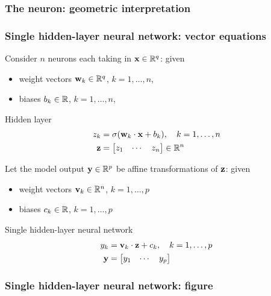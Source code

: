 \begin{frame}
    \frametitle{The neuron: geometric interpretation}
\end{frame}

\begin{frame}
    \frametitle{Single hidden-layer neural network: vector equations}

    Consider $n$ neurons each taking in $\mathbf{x} \in \mathbb{R}^q$: given
    \begin{itemize}
        \item weight vectors $\mathbf{w}_k \in \mathbb{R}^q$, $k = 1, \ldots, n$,
        \item biases $b_k \in \mathbb{R}$, $k = 1, \ldots, n$,
    \end{itemize}
    \begin{block}{Hidden layer}
        \vspace{-1em}
        \begin{align*}
            z_k &= \sigma(\mathbf{w}_k \cdot \mathbf{x} + b_k), \quad k = 1, \ldots, n \\
            \mathbf{z} &= \begin{bmatrix} z_1 & \cdots & z_n \end{bmatrix} \in \mathbb{R}^n
        \end{align*}
    \end{block}
    \pause

    Let the model output $\mathbf{y} \in \mathbb{R}^p$ be affine transformations of $\mathbf{z}$: given
    \begin{itemize}
        \item weight vectors $\mathbf{v}_k \in \mathbb{R}^n$, $k = 1, \ldots, p$
        \item biases $c_k \in \mathbb{R}$, $k = 1, \ldots, p$
    \end{itemize}
    \begin{block}{Single hidden-layer neural network}
        \vspace{-1em}
        \begin{align*}
            y_k &= \mathbf{v}_k \cdot \mathbf{z} + c_k, \quad k = 1, \ldots, p \\
            \mathbf{y} &= \begin{bmatrix} y_1 & \cdots & y_p \end{bmatrix}
        \end{align*}
    \end{block}
\end{frame}

\begin{frame}
    \frametitle{Single hidden-layer neural network: figure}

    \centering
    
\end{frame}

